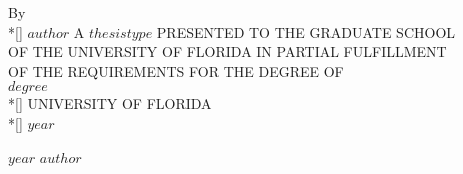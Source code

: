 \documentclass{ufdissertation}[overrideChapters] %
\begin{document}

\docBodyfalse

\begin{center}
    \thispagestyle{empty}%
      \vspace*{-0.4in}%
        \vfill%
        By \\*[\baselineskip]%
        \MakeUppercase{$author$}%
        \vfill%
        A \MakeUppercase{$thesistype$} PRESENTED TO THE GRADUATE SCHOOL \\%
        OF THE UNIVERSITY OF FLORIDA IN PARTIAL FULFILLMENT \\%
        OF THE REQUIREMENTS FOR THE DEGREE OF \\%
        \MakeUppercase{$degree$} \\*[\baselineskip]%
        UNIVERSITY OF FLORIDA \\*[\baselineskip]%
        {$year$}%
\end{center}

\newpage


\newpage
  \vspace*{\fill}
    \begin{center}
        \textcopyright{} {$year$} {$author$}
    \end{center}
  \vspace*{\fill}
\newpage

\setcounter{secnumdepth}{-1}     %
                                 


\realSingleSpace
  \tableofcontents %



\listoftables  %


\end{document}
